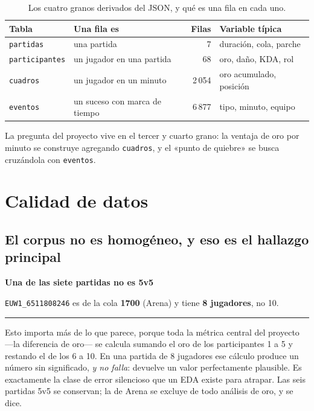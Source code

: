 \documentclass[11pt,letterpaper]{article}
\newenvironment{respuesta}[1]
  {\par\medskip\setlength{\fboxsep}{10pt}%
   \begin{lrbox}{\cajaresp}%
   \begin{minipage}{\dimexpr\linewidth-2\fboxsep-3pt\relax}%
   \color{tinta}\textcolor{azul}{\textbf{#1}}\par\smallskip\ignorespaces}
  {\end{minipage}%
   \end{lrbox}%
   \noindent\textcolor{azul}{\rule[-\dp\cajaresp]{3pt}{\dimexpr\ht\cajaresp+\dp\cajaresp\relax}}%
   \colorbox{papel}{\usebox{\cajaresp}}\par\medskip}
\newcommand{\dato}[1]{\textbf{\textcolor{azul}{#1}}}
\begin{document}
\begin{table}[H]\centering\small
\caption{Los cuatro granos derivados del JSON, y qué es una fila en cada uno.}
\label{tab:granos}
\begin{tabular}{llrl}
\toprule
Tabla & Una fila es & Filas & Variable típica \\
\midrule
\texttt{partidas} & una partida & 7 & duración, cola, parche \\
\texttt{participantes} & un jugador en una partida & 68 & oro, daño, KDA, rol \\
\texttt{cuadros} & un jugador en un minuto & 2\,054 & oro acumulado, posición \\
\texttt{eventos} & un suceso con marca de tiempo & 6\,877 & tipo, minuto, equipo \\
\bottomrule
\end{tabular}
\end{table}

\noindent La pregunta del proyecto vive en el tercer y cuarto grano: la ventaja de
oro por minuto se construye agregando \texttt{cuadros}, y el «punto de quiebre» se
busca cruzándola con \texttt{eventos}.

\section{Calidad de datos}



\subsection{El corpus no es homogéneo, y eso es el hallazgo principal}

\begin{respuesta}{Una de las siete partidas no es 5v5}
\texttt{EUW1\_6511808246} es de la cola \dato{1700} (Arena) y tiene
\dato{8 jugadores}, no 10.
\end{respuesta}

\noindent Esto importa más de lo que parece, porque toda la métrica central del
proyecto —la diferencia de oro— se calcula sumando el oro de los participantes 1 a
5 y restando el de los 6 a 10. En una partida de 8 jugadores ese cálculo produce
un número sin significado, \emph{y no falla}: devuelve un valor perfectamente
plausible. Es exactamente la clase de error silencioso que un EDA existe para
atrapar. Las seis partidas 5v5 se conservan; la de Arena se excluye de todo
análisis de oro, y se dice.
\end{document}
